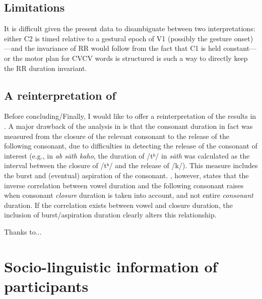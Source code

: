 \documentclass[]{JASAnew}
\begin{document}
\hypertarget{limitations}{%
\subsection{Limitations}\label{limitations}}

It is difficult given the present data to disambiguate between two
interpretations: either C2 is timed relative to a gestural epoch of V1
(possibly the gesture onset)---and the invariance of RR would follow
from the fact that C1 is held constant--- or the motor plan for CVCV
words is structured is such a way to directly keep the RR duration
invariant.

\hypertarget{a-reinterpretation-of-maddieson1976}{%
\subsection{\texorpdfstring{A reinterpretation of
\citet{maddieson1976}}{A reinterpretation of @maddieson1976}}\label{a-reinterpretation-of-maddieson1976}}

Before concluding/Finally, I would like to offer a reinterpretation of
the results in \citet{maddieson1976}. A major drawback of the analysis
in \citet{maddieson1976} is that the consonant duration in fact was
measured from the closure of the relevant consonant to the release of
the following consonant, due to difficulties in detecting the release of
the consonant of interest (e.g., in \emph{ab sāth kaho}, the duration of
/tʰ/ in \emph{sāth} was calculated as the interval between the closure
of /tʰ/ and the release of /k/). This measure includes the burst and
(eventual) aspiration of the consonant. \citet{slis1969a}, however,
states that the inverse correlation between vowel duration and the
following consonant raises when consonant \emph{closure} duration is
taken into account, and not entire \emph{consonant} duration. If the
correlation exists between vowel and closure duration, the inclusion of
burst/aspiration duration clearly alters this relationship.

\begin{acknowledgments}
Thanks to...
\end{acknowledgments}

\appendix

\section{Socio-linguistic information of participants}
\label{a:socioling}
\end{document}
